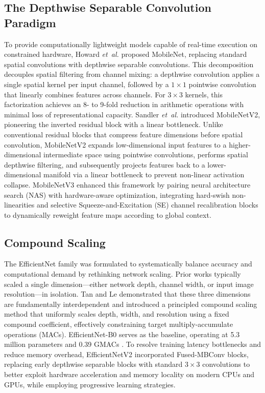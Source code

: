 \subsection{The Depthwise Separable Convolution Paradigm}
To provide computationally lightweight models capable of real-time execution on constrained hardware, Howard \emph{et~al.} \cite{15} proposed MobileNet, replacing standard spatial convolutions with depthwise separable convolutions. This decomposition decouples spatial filtering from channel mixing: a depthwise convolution applies a single spatial kernel per input channel, followed by a $1\times1$ pointwise convolution that linearly combines features across channels. For $3\times3$ kernels, this factorization achieves an 8- to 9-fold reduction in arithmetic operations with minimal loss of representational capacity. Sandler \emph{et~al.} \cite{37} introduced MobileNetV2, pioneering the inverted residual block with a linear bottleneck. Unlike conventional residual blocks that compress feature dimensions before spatial convolution, MobileNetV2 expands low-dimensional input features to a higher-dimensional intermediate space using pointwise convolutions, performs spatial depthwise filtering, and subsequently projects features back to a lower-dimensional manifold via a linear bottleneck to prevent non-linear activation collapse. MobileNetV3 \cite{19} enhanced this framework by pairing neural architecture search (NAS) \cite{50} with hardware-aware optimization, integrating hard-swish non-linearities and selective Squeeze-and-Excitation (SE) channel recalibration blocks \cite{16} to dynamically reweight feature maps according to global context.

\subsection{Compound Scaling}
The EfficientNet family \cite{40} was formulated to systematically balance accuracy and computational demand by rethinking network scaling. Prior works typically scaled a single dimension---either network depth, channel width, or input image resolution---in isolation. Tan and Le demonstrated that these three dimensions are fundamentally interdependent and introduced a principled compound scaling method that uniformly scales depth, width, and resolution using a fixed compound coefficient, effectively constraining target multiply-accumulate operations (MACs). EfficientNet-B0 serves as the baseline, operating at 5.3 million parameters and 0.39 GMACs \cite{40}. To resolve training latency bottlenecks and reduce memory overhead, EfficientNetV2 \cite{41} incorporated Fused-MBConv blocks, replacing early depthwise separable blocks with standard $3\times3$ convolutions to better exploit hardware acceleration and memory locality on modern CPUs and GPUs, while employing progressive learning strategies.

